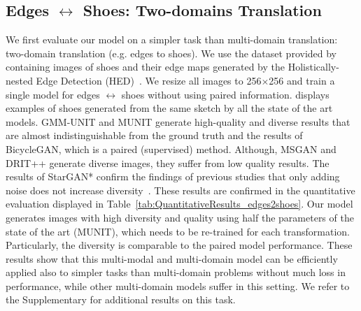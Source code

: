 \documentclass[runningheads]{llncs}
\begin{document}
\subsection{Edges $\leftrightarrow$ Shoes: Two-domains Translation}
We first evaluate our model on a simpler task than multi-domain translation: two-domain translation (e.g. edges to shoes).
We use the dataset provided by~\cite{isola2017image,zhu2017unpaired} containing images of shoes and their edge maps generated by the Holistically-nested Edge Detection (HED)~\cite{xie2015holistically}. We resize all images to 256$\times$256 and train a single model for edges $\leftrightarrow$ shoes without using paired information.  displays examples of shoes generated from the same sketch by all the state of the art models.
GMM-UNIT and MUNIT generate high-quality and diverse results that are almost indistinguishable from the ground truth and the results of BicycleGAN, which is a paired (supervised) method. Although, MSGAN and DRIT++ generate diverse images, they suffer from low quality results. The results of StarGAN* confirm the findings of previous studies that only adding noise does not increase diversity~\cite{isola2017image,mathieu2015deep,zhu2017toward}.
These results are confirmed in the quantitative evaluation displayed in Table~\ref{tab:QuantitativeResults_edges2shoes}. 
Our model generates images with high diversity and quality using half the parameters of the state of the art (MUNIT), which needs to be re-trained for each transformation. Particularly, the diversity is comparable to the paired model performance. These results show that this multi-modal and multi-domain model can be efficiently applied also to simpler tasks than multi-domain problems without much loss in performance, while other multi-domain models suffer in this setting.
We refer to the Supplementary for additional results on this task.
\end{document}
